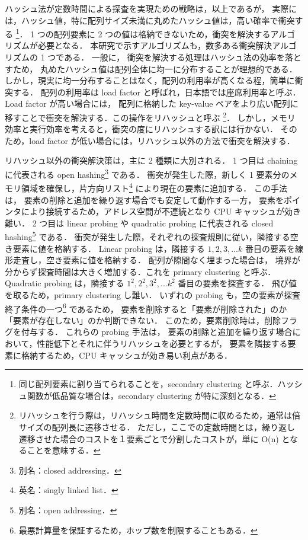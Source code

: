 ハッシュ法が定数時間による探査を実現ための戦略は，以上であるが，
実際には，ハッシュ値，特に配列サイズ未満に丸めたハッシュ値は，高い確率で衝突する
\footnote{
同じ配列要素に割り当てられることを，secondary clustering と呼ぶ．ハッシュ関数が低品質な場合は，secondary clustering が特に深刻となる．
}．
1 つの配列要素に 2 つの値は格納できないため，衝突を解決するアルゴリズムが必要となる．
本研究で示すアルゴリズムも，数多ある衝突解決アルゴリズムの 1 つである．
一般に，
衝突を解決する処理はハッシュ法の効率を落とすため，
丸めたハッシュ値は配列全体に均一に分布することが理想的である．
しかし，現実に均一分布することはなく，配列の利用率が高くなる程，簡単に衝突する．
配列の利用率は load factor と呼ばれ，日本語では座席利用率と呼ぶ．
Load factor が高い場合には，
配列に格納した key-value ペアをより広い配列に移すことで衝突を解決する．この操作をリハッシュと呼ぶ
\footnote{
リハッシュを行う際は，リハッシュ時間を定数時間に収めるため，通常は倍サイズの配列長に遷移させる．
ただし，ここでの定数時間とは，繰り返し遷移させた場合のコストを１要素ごとで分割したコストが，単に O(n) となることを意味する．
}．
しかし，メモリ効率と実行効率を考えると，衝突の度にリハッシュする訳には行かない．
そのため，load factor が低い場合には，リハッシュ以外の方法で衝突を解決する．

リハッシュ以外の衝突解決策は，主に 2 種類に大別される．
1 つ目は chaining に代表される open hashing\footnote{別名：closed addressing．} である．
衝突が発生した際，新しく 1 要素分のメモリ領域を確保し，片方向リスト\footnote{英名：singly linked list．} により現在の要素に追加する．
この手法は，
要素の削除と追加を繰り返す場合でも安定して動作する一方，
要素をポインタにより接続するため，アドレス空間が不連続となり CPU キャッシュが効き難い．
2 つ目は linear probing や quadratic probing に代表される closed hashing\footnote{別名：open addressing．} である．
衝突が発生した際，それぞれの探査規則に従い，隣接する空き要素に値を格納する．
Linear probing は，隣接する $1, 2, 3, ... k$ 番目の要素を線形走査し，空き要素に値を格納する．
配列が隙間なく埋まった場合は，
境界が分からず探査時間は大きく増加する．これを primary clustering と呼ぶ．
Quadratic probing は，隣接する $1^2, 2^2, 3^2, ... k^2$ 番目の要素を探査する．
飛び値を取るため，primary clustering し難い．
いずれの probing も，空の要素が探査終了条件の一つ\footnote{最悪計算量を保証するため，ホップ数を制限することもある．} であるため，
要素を削除すると「要素が削除された」のか「要素が存在しない」のか判断できない．
このため，要素削除時は，削除フラグを付与する．
これらの probing 手法は，
要素の削除と追加を繰り返す場合において，性能低下とそれに伴うリハッシュを必要とするが，
要素を隣接する要素に格納するため，CPU キャッシュが効き易い利点がある．

